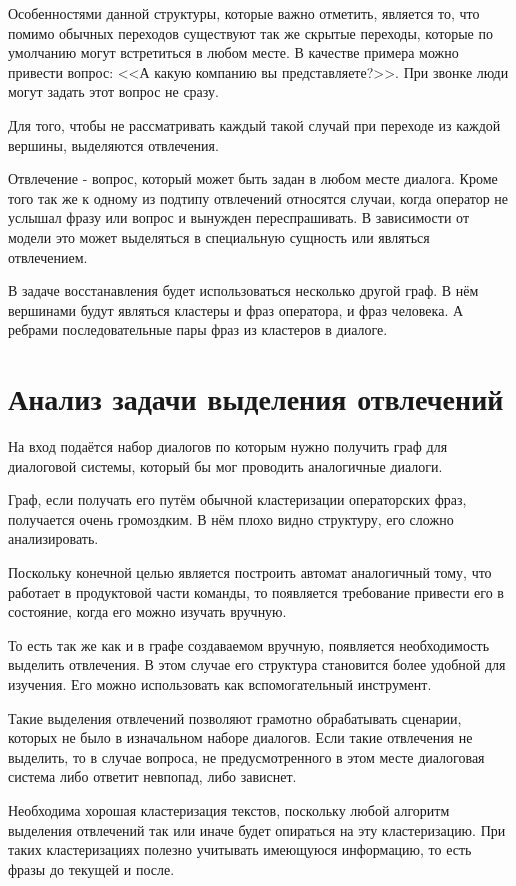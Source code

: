 \documentclass[specification,annotation]{itmo-student-thesis}
\begin{document}
	Особенностями данной структуры, которые важно отметить, является то, что помимо обычных переходов существуют так же скрытые переходы, которые по умолчанию могут встретиться в любом месте. В качестве примера можно привести вопрос: <<А какую компанию вы представляете?>>. При звонке люди могут задать этот вопрос не сразу.
	
	Для того, чтобы не рассматривать каждый такой случай при переходе из каждой вершины, выделяются $\textbf{отвлечения}$. 
	
	$\textbf{Отвлечение}$ - вопрос, который может быть задан в любом месте диалога. Кроме того так же к одному из подтипу отвлечений относятся случаи, когда оператор не услышал фразу или вопрос и вынужден переспрашивать. В зависимости от модели это может выделяться в специальную сущность или являться отвлечением.
	
	В задаче восстанавления будет использоваться несколько другой граф. В нём вершинами будут являться кластеры и фраз оператора, и фраз человека. А ребрами последовательные пары фраз из кластеров в диалоге.
	
	\section{Анализ задачи выделения отвлечений}
	На вход подаётся набор диалогов по которым нужно получить граф для диалоговой системы, который бы мог проводить аналогичные диалоги.
	
	Граф, если получать его путём обычной кластеризации операторских фраз, получается очень громоздким. В нём плохо видно структуру, его сложно анализировать.
	
	Поскольку конечной целью является построить автомат аналогичный тому, что работает в продуктовой части команды, то появляется требование привести его в состояние, когда его можно изучать вручную. 
	
	То есть так же как и в графе создаваемом вручную, появляется необходимость выделить отвлечения. В этом случае его структура становится более удобной для изучения. Его можно использовать как вспомогательный инструмент. 
	
	Такие выделения отвлечений позволяют грамотно обрабатывать сценарии, которых не было в изначальном наборе диалогов. Если такие отвлечения не выделить, то в случае вопроса, не предусмотренного в этом месте диалоговая система либо ответит невпопад, либо зависнет.
	
	Необходима хорошая кластеризация текстов, поскольку любой алгоритм выделения отвлечений так или иначе будет опираться на эту кластеризацию. При таких кластеризациях полезно учитывать имеющуюся информацию, то есть фразы до текущей и после.
	
\end{document}
